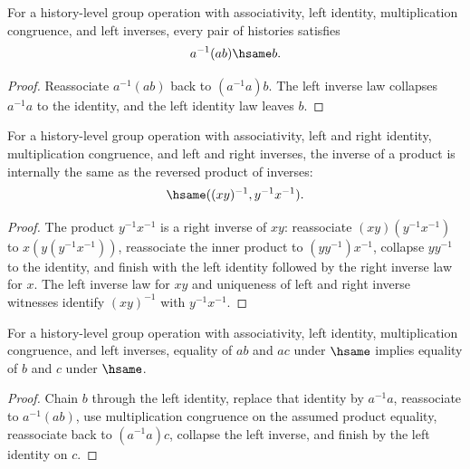 \begin{theorem}
\label{thm:group-mul-left-inverse-cancel}
For a history-level group operation with associativity, left identity,
multiplication congruence, and left inverses, every pair of histories satisfies
$$
a^{-1}(ab)\hsame b.
$$
\end{theorem}
\begin{proof}
Reassociate $a^{-1}(ab)$ back to $(a^{-1}a)b$. The left inverse law collapses
$a^{-1}a$ to the identity, and the left identity law leaves $b$.
\end{proof}

\begin{theorem}
\label{thm:group-inverse-mul-reverse}
For a history-level group operation with associativity, left and right identity,
multiplication congruence, and left and right inverses, the inverse of a product
is internally the same as the reversed product of inverses:
$$
\hsame((xy)^{-1},y^{-1}x^{-1}).
$$
\end{theorem}
\begin{proof}
The product $y^{-1}x^{-1}$ is a right inverse of $xy$: reassociate
$(xy)(y^{-1}x^{-1})$ to $x(y(y^{-1}x^{-1}))$, reassociate the inner product to
$(yy^{-1})x^{-1}$, collapse $yy^{-1}$ to the identity, and finish with the
left identity followed by the right inverse law for $x$. The left inverse law
for $xy$ and uniqueness of left and right inverse witnesses identify
$(xy)^{-1}$ with $y^{-1}x^{-1}$.
\end{proof}

\begin{theorem}
\label{thm:group-left-cancellation}
For a history-level group operation with associativity, left identity,
multiplication congruence, and left inverses, equality of \(ab\) and \(ac\)
under \(\hsame\) implies equality of \(b\) and \(c\) under \(\hsame\).
\end{theorem}
\begin{proof}
Chain \(b\) through the left identity, replace that identity by
\(a^{-1}a\), reassociate to \(a^{-1}(ab)\), use multiplication congruence on
the assumed product equality, reassociate back to \((a^{-1}a)c\), collapse the
left inverse, and finish by the left identity on \(c\).
\end{proof}

